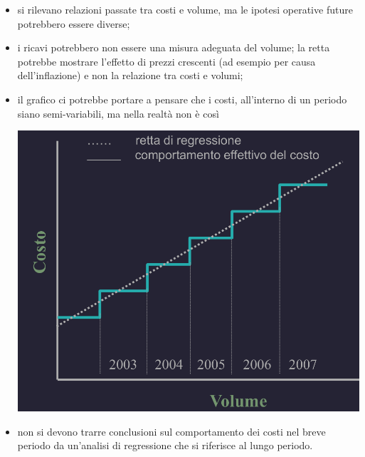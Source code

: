 \documentclass{article}
\begin{document}
\begin{itemize}
    \item si rilevano relazioni passate tra costi e volume, ma le ipotesi operative future potrebbero essere diverse;
    \item i ricavi potrebbero non essere una misura adeguata del volume; la retta potrebbe mostrare l'effetto di prezzi crescenti (ad esempio per causa dell'inflazione) e non la relazione tra costi e volumi;
    \item il grafico ci potrebbe portare a pensare che i costi, all'interno di un periodo siano semi-variabili, ma nella realtà non è così
    \begin{center}
        \includegraphics[scale=0.3]{Image/RegressioneLin_2.png}
    \end{center}

    \item non si devono trarre conclusioni sul comportamento dei costi nel breve periodo da un'analisi di regressione che si riferisce al lungo periodo.
\end{itemize}
\end{document}
